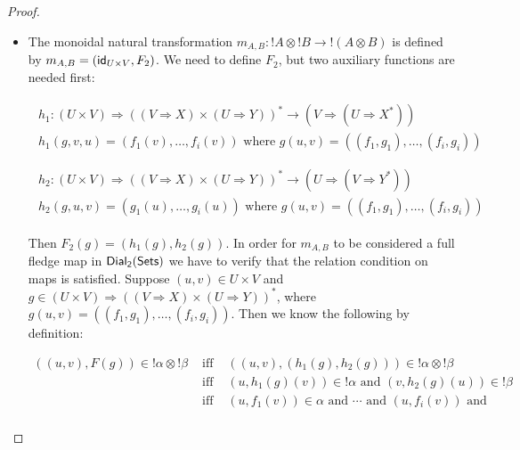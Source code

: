 \begin{proof}
\begin{report}
\begin{center}
\begin{itemize}
    \item The monoidal natural transformation
      $m_{A,B} : !A \otimes !B \to !(A \otimes B)$ is defined by
      $m_{A,B} = (\mathsf{id}_{U \times V},F_2)$. We need to define $F_2$,
      but two auxiliary functions are needed first:
      \begin{center}
        \begin{math}
          \begin{array}{lll}
            \begin{array}{lll}
              h_1 : (U \times V) \Rightarrow ((V \Rightarrow X) \times (U \Rightarrow Y))^* \to 
                    (V \Rightarrow (U \Rightarrow X^*))\\
              h_1(g,v,u) = (f_1(v),\ldots,f_i(v))
              \text{ where } g(u,v) = ((f_1,g_1),\ldots,(f_i,g_i))
            \end{array}
            \\
            &  \\
            \begin{array}{lll}
              h_2 : (U \times V) \Rightarrow ((V \Rightarrow X) \times (U \Rightarrow Y))^* \to 
                    (U \Rightarrow (V \Rightarrow Y^*))\\
              h_2(g,u,v) = (g_1(u),\ldots,g_i(u))
              \text{ where } g(u,v) = ((f_1,g_1),\ldots,(f_i,g_i))
            \end{array}
          \end{array}
        \end{math}
      \end{center}
      Then $F_2(g) = (h_1(g),h_2(g))$.  In order for $m_{A,B}$ to be
      considered a full fledge map in $\mathsf{Dial_2}(\mathsf{Sets})$ we have to verify that
      the relation condition on maps is satisfied.  Suppose $(u,v) \in U \times V$ and 
      $g \in (U \times V) \Rightarrow ((V \Rightarrow X) \times (U \Rightarrow Y))^*$, 
      where $g(u,v) = ((f_1,g_1), \ldots,(f_i,g_i))$. Then we know the following by definition:
      \begin{center}
        \begin{math}
          \begin{array}{lll}
            ((u,v),F(g)) \in !\alpha \otimes !\beta 
            & \text{ iff } & ((u,v),(h_1(g),h_2(g))) \in !\alpha \otimes !\beta\\
            & \text{ iff } & (u,h_1(g)(v)) \in !\alpha \text{ and } (v,h_2(g)(u)) \in !\beta\\
            & \text{ iff } & (u,f_1(v)) \in \alpha \text{ and } \cdots \text{ and } (u,f_i(v)) \text{ and }\\

\end{array}
\end{math}
\end{center}
\end{itemize}
\end{center}
\end{report}
\end{proof}
